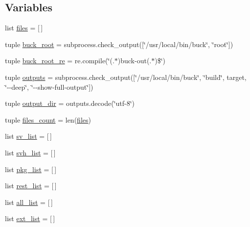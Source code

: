 \subsection*{Variables}
\begin{DoxyCompactItemize}
\item 
list \hyperlink{namespacesrc_1_1fb__utils_a435c19027706b72a531eda623692de13}{files} = \mbox{[}$\,$\mbox{]}
\item 
tuple \hyperlink{namespacesrc_1_1fb__utils_ada262490c393f4f9b3af89babf6508e2}{buck\-\_\-root} = subprocess.\-check\-\_\-output(\mbox{[}\char`\"{}/usr/local/bin/buck\char`\"{}, \char`\"{}root\char`\"{}\mbox{]})
\item 
tuple \hyperlink{namespacesrc_1_1fb__utils_aa9db9d7eca83e9593edbe27a7f90fe32}{buck\-\_\-root\-\_\-re} = re.\-compile(\char`\"{}(.$\ast$)buck-\/out(.$\ast$)\$\char`\"{})
\item 
tuple \hyperlink{namespacesrc_1_1fb__utils_aa9f97d2b038d4ceb5ffc2e60bf863cf9}{outputs} = subprocess.\-check\-\_\-output(\mbox{[}\char`\"{}/usr/local/bin/buck\char`\"{}, \char`\"{}build\char`\"{}, target, \char`\"{}-\/-\/deep\char`\"{}, \char`\"{}-\/-\/show-\/full-\/output\char`\"{}\mbox{]})
\item 
tuple \hyperlink{namespacesrc_1_1fb__utils_aba80a664165e1497d475c2f9f45fb8dd}{output\-\_\-dir} = outputs.\-decode(\char`\"{}utf-\/8\char`\"{})
\item 
tuple \hyperlink{namespacesrc_1_1fb__utils_a66112e09f3319ed5f0ee51b569c867f6}{files\-\_\-count} = len(\hyperlink{namespacesrc_1_1fb__utils_a435c19027706b72a531eda623692de13}{files})
\item 
list \hyperlink{namespacesrc_1_1fb__utils_ae8e6404645e507153d25d4fc42b3b024}{sv\-\_\-list} = \mbox{[}$\,$\mbox{]}
\item 
list \hyperlink{namespacesrc_1_1fb__utils_af652a83d9c7ea441da07100ce81e0795}{svh\-\_\-list} = \mbox{[}$\,$\mbox{]}
\item 
list \hyperlink{namespacesrc_1_1fb__utils_aca9435d4a8098b550d3f06d94fe5d548}{pkg\-\_\-list} = \mbox{[}$\,$\mbox{]}
\item 
list \hyperlink{namespacesrc_1_1fb__utils_a48973a5f6d3b86bb52822b7c85f61444}{rest\-\_\-list} = \mbox{[}$\,$\mbox{]}
\item 
list \hyperlink{namespacesrc_1_1fb__utils_a537838206095ac211484b3d6f0e7ab49}{all\-\_\-list} = \mbox{[}$\,$\mbox{]}
\item 
list \hyperlink{namespacesrc_1_1fb__utils_ab692d5d23bd1968e764276e3fb43b566}{ext\-\_\-list} = \mbox{[}$\,$\mbox{]}

\end{DoxyCompactItemize}
